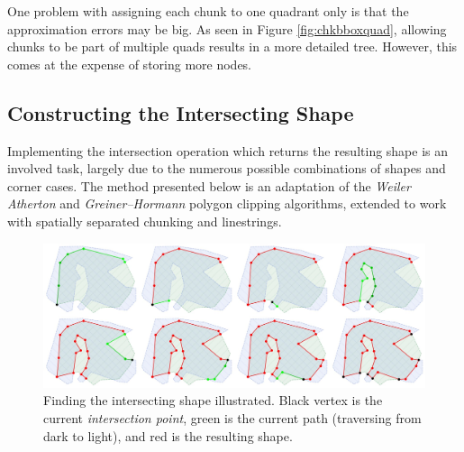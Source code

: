 

One problem with assigning each chunk to one quadrant only is that the approximation errors may be big. As seen in Figure \ref{fig:chkbboxquad}, allowing chunks to be part of multiple quads results in a more detailed tree. However, this comes at the expense of storing more nodes.

\subsection{Constructing the Intersecting Shape}
Implementing the intersection operation which returns the resulting shape is an involved task, largely due to the numerous possible combinations of shapes and corner cases. The method presented below is an adaptation of the \emph{Weiler Atherton} and \emph{Greiner–Hormann} polygon clipping algorithms, extended to work with spatially separated chunking and linestrings.

\begin{figure}[htbp]
    \centering
    \includegraphics[width=15cm]{images/intersecting_shape.png}
    \caption{Finding the intersecting shape illustrated. Black vertex is the current \emph{intersection point}, green is the current path (traversing from dark to light), and red is the resulting shape.}
    \label{fig:shapegen}
\end{figure}


